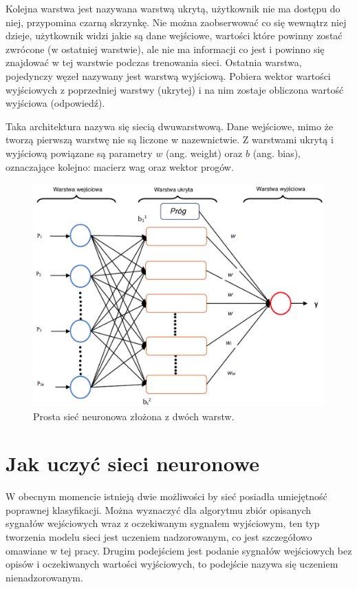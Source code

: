 \documentclass[12pt,a4paper,twoside,titlepage,openright]{book}
\begin{document}
Kolejna warstwa jest nazywana warstwą ukrytą, użytkownik nie ma dostępu do niej, przypomina czarną skrzynkę. Nie można zaobserwować co się wewnątrz niej dzieje, użytkownik widzi jakie są dane wejściowe, wartości które powinny zostać zwrócone (w ostatniej warstwie), ale nie ma informacji co jest i powinno się znajdować w tej warstwie podczas trenowania sieci.
Ostatnia warstwa, pojedynczy węzeł nazywany jest warstwą wyjściową. Pobiera wektor wartości wyjściowych z poprzedniej warstwy (ukrytej) i na nim zostaje obliczona wartość wyjściowa (odpowiedź).

Taka architektura nazywa się siecią dwuwarstwową. Dane wejściowe, mimo że tworzą pierwszą warstwę nie są liczone w nazewnictwie.
Z warstwami ukrytą i wyjściową powiązane są parametry \(w\) (ang. weight) oraz \(b\) (ang. bias), oznaczające kolejno: macierz wag oraz wektor progów.

\begin{figure}[ht]
	\centering
			\includegraphics[resolution=100, scale=0.2]{SiecNeuronowa.png}
		\caption{Prosta sieć neuronowa złożona z dwóch warstw.}
\end{figure}

\section{Jak uczyć sieci neuronowe}
W obecnym momencie istnieją dwie możliwości by sieć posiadła umiejętność poprawnej klasyfikacji. Można wyznaczyć dla algorytmu zbiór opisanych sygnałów wejściowych wraz z oczekiwanym sygnałem wyjściowym, ten typ tworzenia modelu sieci jest uczeniem nadzorowanym, co jest szczegółowo omawiane w tej pracy. Drugim podejściem jest podanie sygnałów wejściowych bez opisów i oczekiwanych wartości wyjściowych, to podejście nazywa się uczeniem nienadzorowanym.
\end{document}
